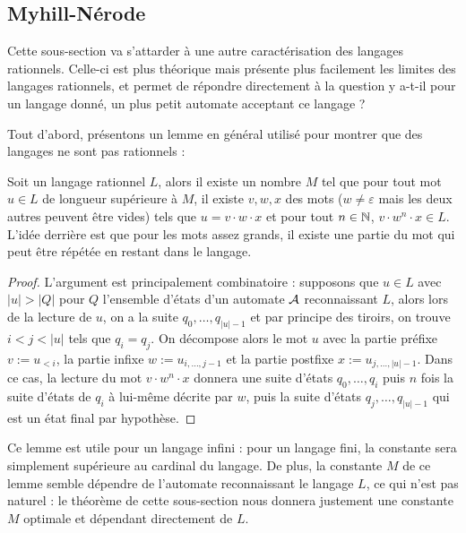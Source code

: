 \subsection{Myhill-Nérode}

Cette sous-section va s'attarder à une autre caractérisation des langages rationnels. Celle-ci est plus théorique mais présente plus facilement les limites des langages rationnels, et permet de répondre directement à la question \og y a-t-il pour un langage donné, un plus petit automate acceptant ce langage ?\fg{}

Tout d'abord, présentons un lemme en général utilisé pour montrer que des langages ne sont pas rationnels :

\begin{lem}[De l'étoile]
    Soit un langage rationnel $L$, alors il existe un nombre $M$ tel que pour tout mot $u\in L$ de longueur supérieure à $M$, il existe $v,w,x$ des mots ($w\neq\varepsilon$ mais les deux autres peuvent être vides) tels que $u = v\cdot w\cdot x$ et pour tout $n\in \mathbb{N}$, $v\cdot w^n\cdot x \in L$. L'idée derrière est que pour les mots assez grands, il existe une partie du mot qui peut être répétée en restant dans le langage.
\end{lem}

\begin{proof}
    L'argument est principalement combinatoire : supposons que $u\in L$ avec $|u| > |Q|$ pour $Q$ l'ensemble d'états d'un automate $\mathcal A$ reconnaissant $L$, alors lors de la lecture de $u$, on a la suite $q_0,\ldots,q_{|u|-1}$ et par principe des tiroirs, on trouve $i< j < |u|$ tels que $q_i = q_j$. On décompose alors le mot $u$ avec la partie préfixe $v := u_{<i}$, la partie infixe $w := u_{i,\ldots,j-1}$ et la partie postfixe $x := u_{j,\ldots,|u|-1}$. Dans ce cas, la lecture du mot $v\cdot w^n\cdot x$ donnera une suite d'états $q_0,\ldots,q_i$ puis $n$ fois la suite d'états de $q_i$ à lui-même décrite par $w$, puis la suite d'états $q_j,\ldots,q_{|u|-1}$  qui est un état final par hypothèse.
\end{proof}

\begin{rmk}
    Ce lemme est utile pour un langage infini : pour un langage fini, la constante sera simplement supérieure au cardinal du langage. De plus, la constante $M$ de ce lemme semble dépendre de l'automate reconnaissant le langage $L$, ce qui n'est pas naturel : le théorème de cette sous-section nous donnera justement une constante $M$ optimale et dépendant directement de $L$.
\end{rmk}


